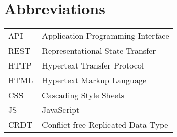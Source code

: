 \chapter*{Abbreviations}


\begin{flushleft}
\begin{tabular}{l p{0.8\linewidth}}
API      & Application Programming Interface\\
REST     & Representational State Transfer\\
HTTP     & Hypertext Transfer Protocol\\
HTML     & Hypertext Markup Language\\
CSS      & Cascading Style Sheets\\
JS       & JavaScript\\
CRDT     & Conflict-free Replicated Data Type\\
\end{tabular}
\end{flushleft}

